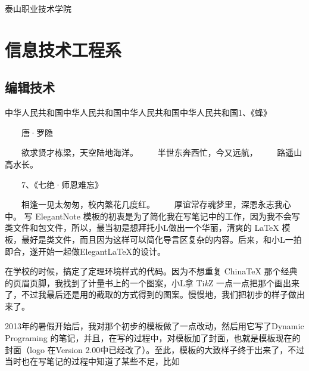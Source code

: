 \documentclass[12pt,a4paper]{ctexbook}
\begin{document}
\hfill {泰山职业技术学院}
\chapter{信息技术工程系}
\section{编辑技术}
\fangsong{}

\setlength{\baselineskip}{30pt}
中华人民共和国中华人民共和国中华人民共和国中华人民共和国1、《蜂》

　　唐·罗隐


　　欲求贤才栋梁，天空陆地海洋。
　　半世东奔西忙，今又远航，
　　路遥山高水长。

　　7、《七绝·师恩难忘》

　　相逢一见太匆匆，校内繁花几度红。
　　厚谊常存魂梦里，深恩永志我心中。
写 ElegantNote 模板的初衷是为了简化我在写笔记中的工作，因为我不会写类文件和包文件，所以，最当初是想拜托小L做出一个华丽，清爽的 \LaTeX{} 模板，最好是类文件，而且因为这样可以简化导言区复杂的内容。后来，和小L一拍即合，遂开始一起做Elegant\LaTeX{}的设计。

在学校的时候，搞定了定理环境样式的代码。因为不想重复 China\TeX{} 那个经典的页眉页脚，我找到了计量书上的一个图案，小L拿 Ti\emph{k}Z 一点一点把那个画出来了，不过我最后还是用的截取的方式得到的图案。慢慢地，我们把初步的样子做出来了。

2013年的暑假开始后，我对那个初步的模板做了一点改动，然后用它写了Dynamic Programing 的笔记，并且，在写的过程中，对模板加了封面，也就是模板现在的封面（logo 在Version 2.00中已经改了）。至此，模板的大致样子终于出来了，不过当时也在写笔记的过程中知道了某些不足，比如
\end{document}
